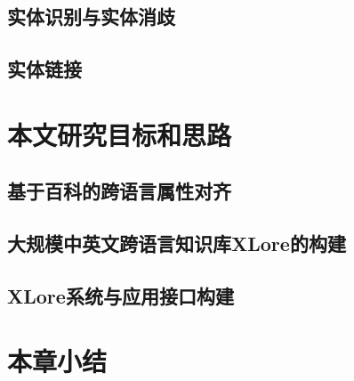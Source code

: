 \subsection{实体识别与实体消歧}
\label{sec:}

\subsection{实体链接}

\section{本文研究目标和思路}

\subsection{基于百科的跨语言属性对齐}
\label{sec:}

\subsection{大规模中英文跨语言知识库XLore的构建}
\label{sec:}

\subsection{XLore系统与应用接口构建}
\label{sec:}

\section{本章小结}



